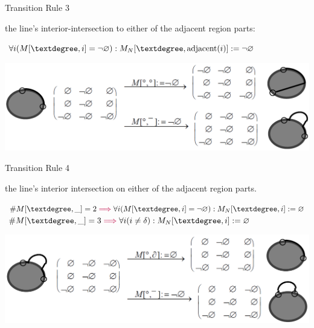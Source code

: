 	\begin{frame}{Transition Rule 3}
		\begin{block}{}
			 the line's interior-intersection to either of the adjacent region parts:
		\end{block}
		\begin{block}{}
			\centering $ \forall i (M[\textdegree, i] = \NotEmpty):
			M_{N}[\textdegree, \text{adjacent}(i)] := \NotEmpty $
		\end{block}
		\begin{block}{}
			\includegraphics[width=\textwidth]{images/smooth_transitions_example_c.png}
		\end{block}
	\end{frame}
	
	\begin{frame}{Transition Rule 4}
		\begin{block}{}
			 the line's interior intersection on either of the adjacent region parts.
		\end{block}
		\begin{block}{}
			\centering
			$ \#M[\textdegree, \_] = 2 \Highlight{\implies}
			\forall i (M[\textdegree, i] = \NotEmpty):
			M_{N}[\textdegree, i] := \Empty $
			$ \#M[\textdegree, \_] = 3 \Highlight{\implies}
			\forall i (i \neq \delta):
			M_{N}[\textdegree, i] := \Empty $
		\end{block}
		\begin{block}{}
			\includegraphics[width=\textwidth]{images/smooth_transitions_example_d.png}
		\end{block}
	\end{frame}
	
